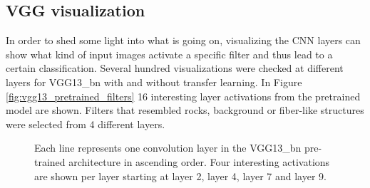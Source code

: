 \subsection{VGG visualization}

In order to shed some light into what is going on, visualizing the CNN layers can show what kind of input images activate a specific filter and thus lead to a certain classification. Several hundred visualizations were checked at different layers for VGG13\_bn with and without transfer learning. In Figure \ref{fig:vgg13_pretrained_filters} 16 interesting layer activations from the pretrained model are shown. Filters that resembled rocks, background or fiber-like structures were selected from 4 different layers.

\begin{figure}[H]
\centering
\caption{Each line represents one convolution layer in the VGG13\_bn pre-trained architecture in ascending order. Four interesting activations are shown per layer starting at layer 2, layer 4, layer 7 and layer 9.}


\end{figure}
